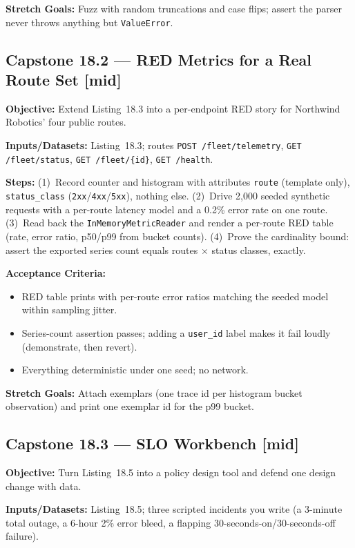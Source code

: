 \textbf{Stretch Goals:} Fuzz with random truncations and case flips; assert
the parser never throws anything but \texttt{ValueError}.

\subsection*{Capstone 18.2 --- RED Metrics for a Real Route Set \hfill [mid]}
\textbf{Objective:} Extend Listing~18.3 into a per-endpoint RED story for
Northwind Robotics' four public routes.

\textbf{Inputs/Datasets:} Listing~18.3; routes \texttt{POST /fleet/telemetry},
\texttt{GET /fleet/status}, \texttt{GET /fleet/\{id\}}, \texttt{GET /health}.

\textbf{Steps:} (1)~Record counter and histogram with attributes
\texttt{route} (template only), \texttt{status\_class}
(\texttt{2xx}/\texttt{4xx}/\texttt{5xx}), nothing else. (2)~Drive 2{,}000
seeded synthetic requests with a per-route latency model and a 0.2\% error
rate on one route. (3)~Read back the \texttt{InMemoryMetricReader} and
render a per-route RED table (rate, error ratio, p50/p99 from bucket
counts). (4)~Prove the cardinality bound: assert the exported series count
equals routes $\times$ status classes, exactly.

\textbf{Acceptance Criteria:}
\begin{itemize}
  \item[$\square$] RED table prints with per-route error ratios matching
        the seeded model within sampling jitter.
  \item[$\square$] Series-count assertion passes; adding a
        \texttt{user\_id} label makes it fail loudly (demonstrate, then
        revert).
  \item[$\square$] Everything deterministic under one seed; no network.
\end{itemize}

\textbf{Stretch Goals:} Attach exemplars (one trace id per histogram bucket
observation) and print one exemplar id for the p99 bucket.

\subsection*{Capstone 18.3 --- SLO Workbench \hfill [mid]}
\textbf{Objective:} Turn Listing~18.5 into a policy design tool and defend
one design change with data.

\textbf{Inputs/Datasets:} Listing~18.5; three scripted incidents you write
(a 3-minute total outage, a 6-hour 2\% error bleed, a flapping
30-seconds-on/30-seconds-off failure).

